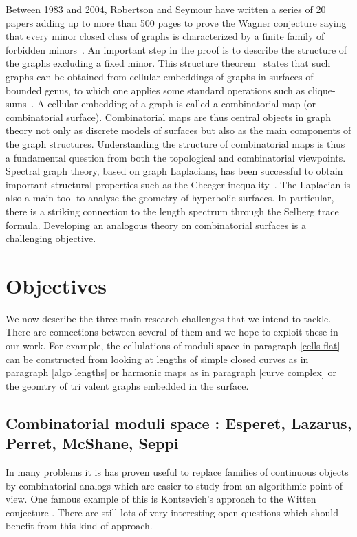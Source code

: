 \documentclass[14pt,fleqn]{article}
\begin{document}
Between 1983 and 2004, Robertson and Seymour have written a series of 20 papers adding up to more than 500 pages to prove the Wagner conjecture saying that every minor closed class of graphs is characterized by a finite family of forbidden minors~\cite{w-gt-70}.  An important step in the proof is to describe the structure of the graphs excluding a fixed minor. This structure theorem~\cite{rs-tv-99} states that such graphs can be obtained from cellular embeddings of graphs in surfaces of bounded genus, to which one applies some standard operations such as clique-sums~\cite{l-gmt-06}. A cellular embedding of a graph is called a combinatorial map (or combinatorial surface). Combinatorial maps are thus central objects in graph theory not only as discrete models of surfaces but also as the main components of the graph structures. Understanding the structure of combinatorial maps is thus a fundamental question from both the topological and combinatorial viewpoints. Spectral graph theory, based on graph Laplacians, has been successful to obtain important structural properties such as the Cheeger inequality~\cite{c-lbsel-70}. The Laplacian is also a main tool to analyse the geometry of hyperbolic surfaces. In particular, there is a striking connection to the length spectrum through the Selberg trace formula. Developing an analogous theory on combinatorial surfaces is a challenging objective.


\section{Objectives}

We now describe the three main research challenges  that we intend to tackle. 
There are connections between several of them 
and we hope to exploit these in our work. 
For example, 
the cellulations of moduli space
in paragraph \ref{cells flat}
can be constructed from looking 
at lengths of simple closed curves
as in paragraph \ref{algo lengths}
or harmonic maps  as in paragraph \ref{curve complex}
or the geomtry of tri valent graphs
embedded in the surface.

\subsection{Combinatorial moduli space {\normalfont : Esperet, Lazarus, Perret, McShane, Seppi}
}


In many problems
it is has proven useful 
to replace families of continuous objects
by combinatorial analogs
which are easier to study from an algorithmic point of view.
One famous example of this
is Kontsevich's approach to the Witten 
conjecture \cite{kontsevich1992}.
There are still lots of 
very interesting open questions
 which should benefit
from this kind of approach.
\end{document}
